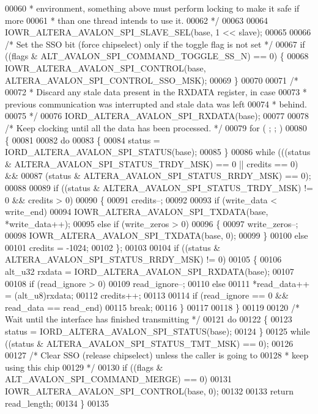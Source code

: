 \begin{DoxyCode}
00060 \textcolor{comment}{   * environment, something above must perform locking to make it safe if more}
00061 \textcolor{comment}{   * than one thread intends to use it.}
00062 \textcolor{comment}{   */}
00063 
00064   IOWR_ALTERA_AVALON_SPI_SLAVE_SEL(base, 1 << slave);
00065   
00066   \textcolor{comment}{/* Set the SSO bit (force chipselect) only if the toggle flag is not set */}
00067   \textcolor{keywordflow}{if} ((flags & ALT_AVALON_SPI_COMMAND_TOGGLE_SS_N) == 0) \{
00068     IOWR_ALTERA_AVALON_SPI_CONTROL(base, ALTERA_AVALON_SPI_CONTROL_SSO_MSK);
00069   \}
00070 
00071   \textcolor{comment}{/*}
00072 \textcolor{comment}{   * Discard any stale data present in the RXDATA register, in case}
00073 \textcolor{comment}{   * previous communication was interrupted and stale data was left}
00074 \textcolor{comment}{   * behind.}
00075 \textcolor{comment}{   */}
00076   IORD_ALTERA_AVALON_SPI_RXDATA(base);
00077     
00078   \textcolor{comment}{/* Keep clocking until all the data has been processed. */}
00079   \textcolor{keywordflow}{for} ( ; ; )
00080   \{
00081     
00082     \textcolor{keywordflow}{do}
00083     \{
00084       status = IORD_ALTERA_AVALON_SPI_STATUS(base);
00085     \}
00086     \textcolor{keywordflow}{while} (((status & ALTERA_AVALON_SPI_STATUS_TRDY_MSK) == 0 || credits == 0) &&
00087             (status & ALTERA_AVALON_SPI_STATUS_RRDY_MSK) == 0);
00088 
00089     \textcolor{keywordflow}{if} ((status & ALTERA\_AVALON\_SPI\_STATUS\_TRDY\_MSK) != 0 && credits > 0)
00090     \{
00091       credits--;
00092 
00093       \textcolor{keywordflow}{if} (write\_data < write\_end)
00094         IOWR_ALTERA_AVALON_SPI_TXDATA(base, *write\_data++);
00095       \textcolor{keywordflow}{else} \textcolor{keywordflow}{if} (write\_zeros > 0)
00096       \{
00097         write\_zeros--;
00098         IOWR_ALTERA_AVALON_SPI_TXDATA(base, 0);
00099       \}
00100       \textcolor{keywordflow}{else}
00101         credits = -1024;
00102     \};
00103 
00104     \textcolor{keywordflow}{if} ((status & ALTERA\_AVALON\_SPI\_STATUS\_RRDY\_MSK) != 0)
00105     \{
00106       alt_u32 rxdata = IORD_ALTERA_AVALON_SPI_RXDATA(base);
00107 
00108       \textcolor{keywordflow}{if} (read\_ignore > 0)
00109         read\_ignore--;
00110       \textcolor{keywordflow}{else}
00111         *read\_data++ = (alt_u8)rxdata;
00112       credits++;
00113 
00114       \textcolor{keywordflow}{if} (read\_ignore == 0 && read\_data == read\_end)
00115         \textcolor{keywordflow}{break};
00116     \}
00117     
00118   \}
00119 
00120   \textcolor{comment}{/* Wait until the interface has finished transmitting */}
00121   \textcolor{keywordflow}{do}
00122   \{
00123     status = IORD_ALTERA_AVALON_SPI_STATUS(base);
00124   \}
00125   \textcolor{keywordflow}{while} ((status & ALTERA_AVALON_SPI_STATUS_TMT_MSK) == 0);
00126 
00127   \textcolor{comment}{/* Clear SSO (release chipselect) unless the caller is going to}
00128 \textcolor{comment}{   * keep using this chip}
00129 \textcolor{comment}{   */}
00130   \textcolor{keywordflow}{if} ((flags & ALT_AVALON_SPI_COMMAND_MERGE) == 0)
00131     IOWR_ALTERA_AVALON_SPI_CONTROL(base, 0);
00132 
00133   \textcolor{keywordflow}{return} read\_length;
00134 \}
00135 
\end{DoxyCode}
